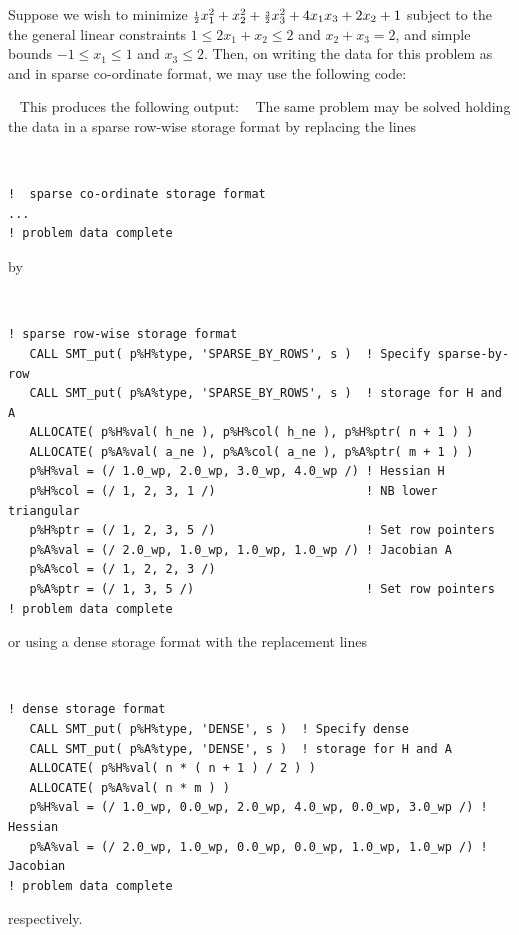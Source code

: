\documentclass{galahad}
\begin{document}
\galexample
Suppose we wish to minimize
${\scriptstyle \frac{1}{2}} x_1^2 + x_2^2 + {\scriptstyle \frac{3}{2}} x_3^2 + 4 x_1 x_3 + 2 x_2 + 1$
subject to the the general linear constraints
$1 \leq  2 x_{1}  +  x_{2}  \leq  2$ and
$x_{2}  +  x_{3}  =  2$, and simple bounds
$-1  \leq  x_{1}  \leq  1$ and $x_{3}  \leq  2$.
Then, on writing the data for this problem as
and
in sparse co-ordinate format,
we may use the following code:

{\tt \small
\VerbatimInput{\packageexample}
}
\noindent
This produces the following output:
{\tt \small
\VerbatimInput{\packageresults}
}
\noindent
The same problem may be solved holding the data in 
a sparse row-wise storage format by replacing the lines
{\tt \small
\begin{verbatim}
!  sparse co-ordinate storage format
...
! problem data complete   
\end{verbatim}
}
\noindent
by
{\tt \small
\begin{verbatim}
! sparse row-wise storage format
   CALL SMT_put( p%H%type, 'SPARSE_BY_ROWS', s )  ! Specify sparse-by-row
   CALL SMT_put( p%A%type, 'SPARSE_BY_ROWS', s )  ! storage for H and A
   ALLOCATE( p%H%val( h_ne ), p%H%col( h_ne ), p%H%ptr( n + 1 ) )
   ALLOCATE( p%A%val( a_ne ), p%A%col( a_ne ), p%A%ptr( m + 1 ) )
   p%H%val = (/ 1.0_wp, 2.0_wp, 3.0_wp, 4.0_wp /) ! Hessian H
   p%H%col = (/ 1, 2, 3, 1 /)                     ! NB lower triangular
   p%H%ptr = (/ 1, 2, 3, 5 /)                     ! Set row pointers
   p%A%val = (/ 2.0_wp, 1.0_wp, 1.0_wp, 1.0_wp /) ! Jacobian A
   p%A%col = (/ 1, 2, 2, 3 /)
   p%A%ptr = (/ 1, 3, 5 /)                        ! Set row pointers  
! problem data complete   
\end{verbatim}
}
\noindent
or using a dense storage format with the replacement lines
{\tt \small
\begin{verbatim}
! dense storage format
   CALL SMT_put( p%H%type, 'DENSE', s )  ! Specify dense
   CALL SMT_put( p%A%type, 'DENSE', s )  ! storage for H and A
   ALLOCATE( p%H%val( n * ( n + 1 ) / 2 ) )
   ALLOCATE( p%A%val( n * m ) )
   p%H%val = (/ 1.0_wp, 0.0_wp, 2.0_wp, 4.0_wp, 0.0_wp, 3.0_wp /) ! Hessian
   p%A%val = (/ 2.0_wp, 1.0_wp, 0.0_wp, 0.0_wp, 1.0_wp, 1.0_wp /) ! Jacobian
! problem data complete   
\end{verbatim}
}
\noindent
respectively.
\end{document}
